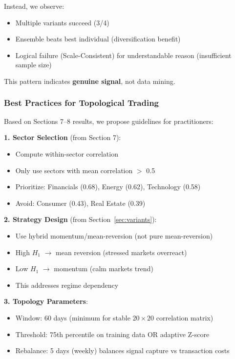 Instead, we observe:
\begin{itemize}
\item \checkmark Multiple variants succeed (3/4)
\item \checkmark Ensemble beats best individual (diversification benefit)
\item \checkmark Logical failure (Scale-Consistent) for understandable reason (insufficient sample size)
\end{itemize}

This pattern indicates \textbf{genuine signal}, not data mining.

\subsubsection{Best Practices for Topological Trading}

Based on Sections 7--8 results, we propose guidelines for practitioners:

\textbf{1. Sector Selection} (from Section 7):
\begin{itemize}
\item Compute within-sector correlation
\item Only use sectors with mean correlation $>$ 0.5
\item Prioritize: Financials (0.68), Energy (0.62), Technology (0.58)
\item Avoid: Consumer (0.43), Real Estate (0.39)
\end{itemize}

\textbf{2. Strategy Design} (from Section~\ref{sec:variants}):
\begin{itemize}
\item Use hybrid momentum/mean-reversion (not pure mean-reversion)
\item High $H_1$ $\rightarrow$ mean reversion (stressed markets overreact)
\item Low $H_1$ $\rightarrow$ momentum (calm markets trend)
\item This addresses regime dependency
\end{itemize}

\textbf{3. Topology Parameters}:
\begin{itemize}
\item Window: 60 days (minimum for stable $20\times 20$ correlation matrix)
\item Threshold: 75th percentile on training data OR adaptive Z-score
\item Rebalance: 5 days (weekly) balances signal capture vs transaction costs
\end{itemize}

